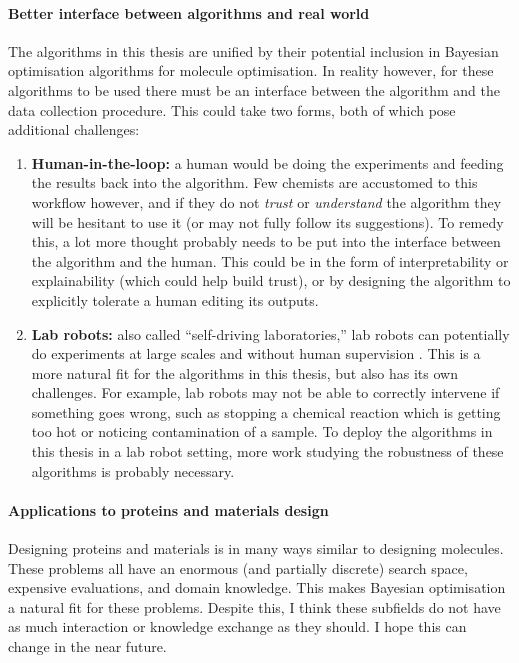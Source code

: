 \paragraph{Better interface between algorithms and real world}
The algorithms in this thesis are unified by their potential inclusion
in Bayesian optimisation algorithms for molecule optimisation.
In reality however, for these algorithms to be used there must be an interface
between the algorithm and the data collection procedure.
This could take two forms, both of which pose additional challenges:
\begin{enumerate}
    \item \textbf{Human-in-the-loop:}
        a human would be doing the experiments and feeding the results back into the algorithm.
        Few chemists are accustomed to this workflow however,
        and if they do not \emph{trust} or \emph{understand} the algorithm
        they will be hesitant to use it (or may not fully follow its suggestions).
        To remedy this, a lot more thought probably needs to be put into the interface
        between the algorithm and the human.
        This could be in the form of interpretability or explainability (which could help build trust),
        or by designing the algorithm to explicitly tolerate a human editing its outputs.
    \item \textbf{Lab robots:}
        also called ``self-driving laboratories,''
        lab robots can potentially do experiments at large scales and
        without human supervision
        \citep{seifrid2022autonomous,koscher2023autonomous,tom2024sdl}.
        This is a more natural fit for the algorithms in this thesis,
        but also has its own challenges.
        For example, lab robots may not be able to correctly intervene if something goes wrong,
        such as stopping a chemical reaction which is getting too hot or noticing contamination
        of a sample.
        To deploy the algorithms in this thesis in a lab robot setting,
        more work studying the robustness of these algorithms is probably necessary.
\end{enumerate}

\paragraph{Applications to proteins and materials design}
Designing proteins and materials is in many ways similar to designing molecules.
These problems all have an enormous (and partially discrete) search space,
expensive evaluations, and domain knowledge.
This makes Bayesian optimisation a natural fit for these problems.
Despite this, I think these subfields do not have as much interaction
or knowledge exchange as they should.
I hope this can change in the near future.

